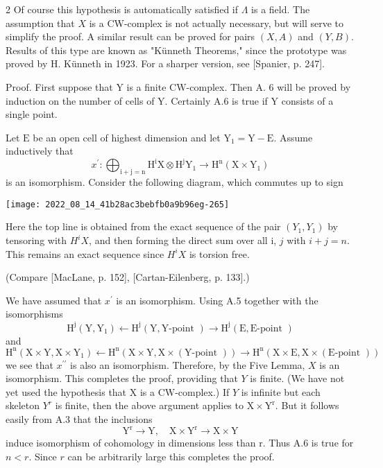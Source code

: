 \documentclass[10pt]{article}
\begin{document}
2 Of course this hypothesis is automatically satisfied if $\Lambda$ is a field. The assumption that $X$ is a CW-complex is not actually necessary, but will serve to simplify the proof. A similar result can be proved for pairs $(X, A)$ and $(Y, B)$. Results of this type are known as "Künneth Theorems," since the prototype was proved by H. Künneth in 1923. For a sharper version, see [Spanier, p. 247].

Proof. First suppose that $\mathrm{Y}$ is a finite $\mathrm{CW}$-complex. Then A. 6 will be proved by induction on the number of cells of Y. Certainly A.6 is true if $\mathrm{Y}$ consists of a single point.

Let $\mathrm{E}$ be an open cell of highest dimension and let $\mathrm{Y}_{1}=\mathrm{Y}-\mathrm{E}$. Assume inductively that
$$
x^{\prime}: \bigoplus_{\mathrm{i}+\mathrm{j}=\mathrm{n}} \mathrm{H}^{\mathrm{i}} \mathrm{X} \otimes \mathrm{H}^{\mathrm{j}} \mathrm{Y}_{1} \rightarrow \mathrm{H}^{\mathrm{n}}\left(\mathrm{X} \times \mathrm{Y}_{1}\right)
$$
is an isomorphism. Consider the following diagram, which commutes up to sign

\texttt{[image: 2022\_08\_14\_41b28ac3bebfb0a9b96eg-265]}

Here the top line is obtained from the exact sequence of the pair $\left(Y_{1}, Y_{1}\right)$ by tensoring with $H^{i} X$, and then forming the direct sum over all i, $j$ with $i+j=n$. This remains an exact sequence since $H^{i} X$ is torsion free.

(Compare [MacLane, p. 152], [Cartan-Eilenberg, p. 133].)

We have assumed that $x^{\prime}$ is an isomorphism. Using A.5 together with the isomorphisms
$$
\mathrm{H}^{\mathrm{j}}\left(\mathrm{Y}, \mathrm{Y}_{1}\right) \leftarrow \mathrm{H}^{\mathrm{j}}(\mathrm{Y}, \mathrm{Y} \text {-point }) \rightarrow \mathrm{H}^{\mathrm{j}}(\mathrm{E}, \mathrm{E} \text {-point })
$$
and
$$
\mathrm{H}^{\mathrm{n}}\left(\mathrm{X} \times \mathrm{Y}, \mathrm{X} \times \mathrm{Y}_{1}\right) \leftarrow \mathrm{H}^{\mathrm{n}}(\mathrm{X} \times \mathrm{Y}, \mathrm{X} \times(\mathrm{Y} \text {-point })) \rightarrow \mathrm{H}^{\mathrm{n}}(\mathrm{X} \times \mathrm{E}, \mathrm{X} \times(\mathrm{E} \text {-point }))
$$
we see that $x^{\prime \prime}$ is also an isomorphism. Therefore, by the Five Lemma, $X$ is an isomorphism. This completes the proof, providing that $Y$ is finite. (We have not yet used the hypothesis that $\mathrm{X}$ is a $\mathrm{CW}$-complex.) If $Y$ is infinite but each skeleton $Y^{r}$ is finite, then the above argument applies to $\mathrm{X} \times \mathrm{Y}^{\mathrm{r}}$. But it follows easily from $\mathrm{A} .3$ that the inclusions
$$
\mathrm{Y}^{\mathrm{r}} \rightarrow \mathrm{Y}, \quad \mathrm{X} \times \mathrm{Y}^{\mathrm{r}} \rightarrow \mathrm{X} \times \mathrm{Y}
$$
induce isomorphism of cohomology in dimensions less than $\mathrm{r}$. Thus A.6 is true for $n<r$. Since $r$ can be arbitrarily large this completes the proof.
\end{document}
